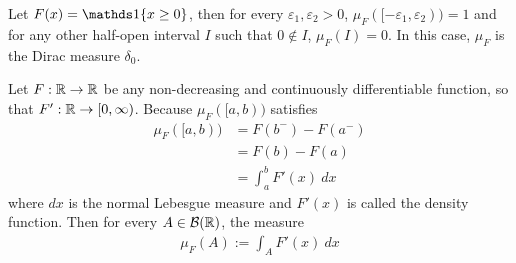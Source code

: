 \documentclass[11pt]{article}
\begin{document}
	\begin{example}
	    Let $F(x) = \id{x \geq 0}$, then for every $\varepsilon_1, \varepsilon_2 > 0$, $\mu_F([-\varepsilon_1, \varepsilon_2)) = 1$ and for any other half-open interval $I$ such that $0 \notin I$, $\mu_F(I) = 0$. In this case, $\mu_F$ is the Dirac measure $\delta_0$.
	\end{example}
	
	\begin{example}
	    Let $F: \mathbb{R} \to \mathbb{R}$ be any non-decreasing and continuously differentiable function, so that $F': \mathbb{R} \to [0, \infty)$.
	    Because $\mu_F([a, b))$ satisfies
	    \begin{align}
	        \mu_F([a, b)) &= F(b^-) - F(a^-) \\
	        &= F(b) - F(a) \\
	        &= \int_a^b F'(x)\ dx
	    \end{align}
	    where $dx$ is the normal Lebesgue measure and $F'(x)$ is called the density function. Then for every $A \in \mathcal{{B}}(\mathbb{R})$, the measure
	    \begin{align}
	        \mu_F(A) := \int_A F'(x)\ dx
	    \end{align}
	\end{example}
\end{document}
